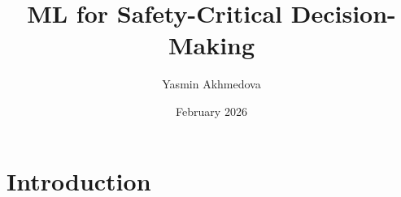 \documentclass{article}
\title{ML for Safety-Critical Decision-Making}
\author{Yasmin Akhmedova}
\date{February 2026}
\begin{document}
\maketitle

\section{Introduction}
\end{document}
